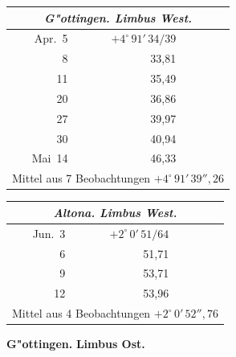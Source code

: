 \documentclass[12pt,a4paper]{article}
\theoremstyle{plain}
\theoremstyle{definition}
\theoremstyle{remark}
\begin{document}
\begin{small}
\begin{tabular}{@{}r|r|r|r|r@{}}
\multicolumn{5}{c}{\textit{G"ottingen. Limbus West.}}\\
\hline
\rule{0pt}{1em}Apr.~5 & $+4^\circ\,91'\,34/39$ & & & \\
\phantom{0}8 & 33,81 & & & \\
11 & 35,49 & & & \\
20 & 36,86 & & & \\
27 & 39,97 & & & \\
30 & 40,94 & & & \\
Mai~14 & 46,33 & & & \\
\hline
\multicolumn{5}{l}{Mittel aus 7 Beobachtungen $+4^\circ\,91'\,39''{,}26$}
\end{tabular}
\hfill
\begin{tabular}{@{}r|r|r|r|r@{}}
\multicolumn{5}{c}{\textit{Altona. Limbus West.}}\\
\hline
\rule{0pt}{1em}Jun.~3 & $+2^\circ\,0'\,51/64$ & & & \\
\phantom{0}6 & 51,71 & & & \\
\phantom{0}9 & 53,71 & & & \\
12 & 53,96 & & & \\
\hline
\multicolumn{5}{l}{Mittel aus 4 Beobachtungen $+2^\circ\,0'\,52''{,}76$}
\end{tabular}
\end{small}

\vspace{0.5cm}
\noindent
\textbf{G"ottingen.}
\hspace{2cm}
\textbf{Limbus Ost.}
\end{document}
